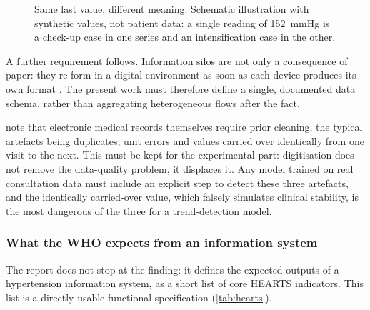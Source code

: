 \documentclass[12pt,a4paper,oneside]{report}
\begin{document}
\begin{figure}[htbp]
\centering
{}
\caption{Same last value, different meaning. Schematic illustration with synthetic values, not patient data: a single reading of 152~mmHg is a check-up case in one series and an intensification case in the other.}\label{fig:act-series}
\end{figure}

A further requirement follows. Information silos are not only a consequence of paper: they re-form in a digital environment as soon as each device produces its own format \parencite{liu2025review}. The present work must therefore define a single, documented data schema, rather than aggregating heterogeneous flows after the fact.


\textcite{liu2025review} note that electronic medical records themselves require prior cleaning, the typical artefacts being duplicates, unit errors and values carried over identically from one visit to the next. This must be kept for the experimental part: digitisation does not remove the data-quality problem, it displaces it. Any model trained on real consultation data must include an explicit step to detect these three artefacts, and the identically carried-over value, which falsely simulates clinical stability, is the most dangerous of the three for a trend-detection model.

\subsubsection{What the WHO expects from an information system}\label{sec:hearts-spec}

The report does not stop at the finding: it defines the expected outputs of a hypertension information system, as a short list of core HEARTS indicators. This list is a directly usable functional specification (\cref{tab:hearts}).
\end{document}
